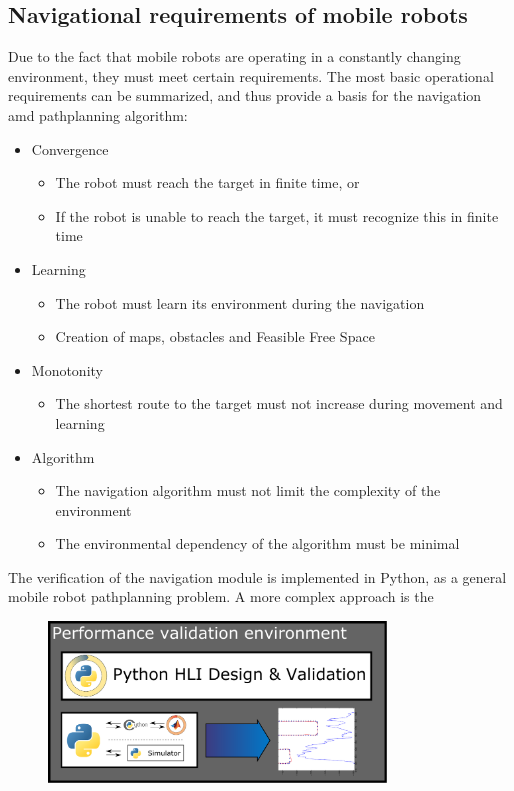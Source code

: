 \subsection{Navigational requirements of mobile robots}

Due to the fact that mobile robots are operating in a constantly changing environment, they must meet certain requirements. The most basic operational requirements can be summarized\cite{navreq}, and thus provide a basis for the navigation amd pathplanning algorithm:

\begin{itemize}
\item Convergence
\begin{itemize}
	\item The robot must reach the target in finite time, or
	\item If the robot is unable to reach the target, it must recognize this in finite time
\end{itemize}
\item Learning
\begin{itemize}
	\item The robot must learn its environment during the navigation
	\item Creation of maps, obstacles and Feasible Free Space
\end{itemize}
\item Monotonity
\begin{itemize}
	\item The shortest route to the target must not increase during movement and learning
\end{itemize}
\item Algorithm
\begin{itemize}
	\item The navigation algorithm must not limit the complexity of the environment
	\item The environmental dependency of the algorithm must be minimal
\end{itemize}

\end{itemize}

The verification of the navigation module is implemented in Python, as a general mobile robot pathplanning problem. A more complex approach is the 

\begin{figure}[H]
	\centering
	\includegraphics[width=0.8\textwidth]{img2/HLIVali}
	\caption{}
	\label{}
\end{figure}

